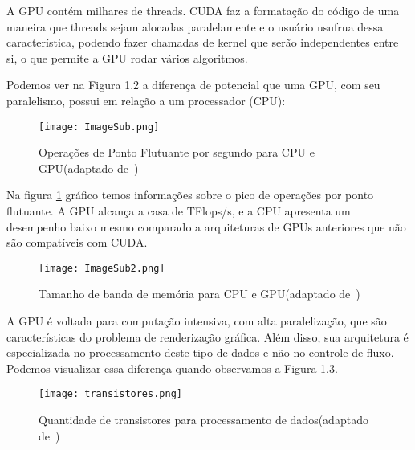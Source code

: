 A GPU contém milhares de threads. CUDA faz a formatação do código de uma maneira que threads sejam alocadas paralelamente e o usuário usufrua dessa característica, podendo fazer chamadas de kernel que serão independentes entre si, o que permite a GPU rodar vários algoritmos.

Podemos ver na Figura 1.2 a diferença de potencial que uma GPU, com seu paralelismo, possui em relação a um processador (CPU):

\begin{figure}[!htb]
	\begin{center}
	\centering
			\texttt{[image: ImageSub.png]}
	\label{fig: graficosCuda1}
	\caption{Operações de Ponto Flutuante por segundo para CPU e GPU(adaptado de~\citep{cuda})}
	\end{center}
\end{figure}

Na figura \ref{fig: graficosCuda1} gráfico temos informações sobre o pico de operações por ponto flutuante. A GPU alcança a casa de TFlops/s, e a CPU apresenta um desempenho baixo mesmo comparado a arquiteturas de GPUs anteriores que não são compatíveis com CUDA.

\begin{figure}[!htb]
	\begin{center}
	\centering
			\texttt{[image: ImageSub2.png]}
	\label{fig: graficosCuda2}
	\caption{Tamanho de banda de memória para CPU e GPU(adaptado de~\citep{cuda})}
	\end{center}
\end{figure}

A GPU é voltada para computação intensiva, com alta paralelização, que são características do problema de renderização gráfica. Além disso, sua arquitetura é especializada no processamento deste tipo de dados e não no controle de fluxo. Podemos visualizar essa diferença quando
observamos a Figura 1.3.

\begin{figure}[!htb]
	\begin{center}
	\centering
			\texttt{[image: transistores.png]}
	\label{fig: transistores}
	\caption{Quantidade de transistores para processamento de dados(adaptado de~\citep{cuda})}
	\end{center}
\end{figure}

